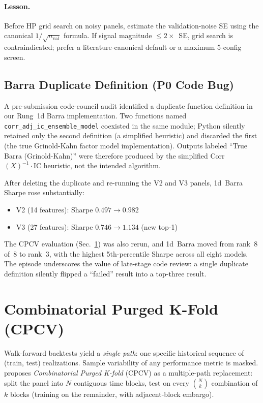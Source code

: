 \documentclass[11pt]{article}
\begin{document}
\paragraph{Lesson.}
Before HP grid search on noisy panels, estimate the validation-noise
SE using the canonical $1/\sqrt{n_{\text{val}}}$ formula. If signal
magnitude $\le 2\times$~SE, grid search is contraindicated; prefer a
literature-canonical default or a maximum 5-config screen.

\subsection{Barra Duplicate Definition (P0 Code Bug)}\label{subsec:barra-fix}

A pre-submission code-council audit identified a duplicate function
definition in our Rung~1d Barra implementation. Two functions named
\texttt{corr\_adj\_ic\_ensemble\_model} coexisted in the same module;
Python silently retained only the second definition (a simplified
heuristic) and discarded the first (the true Grinold-Kahn factor model
implementation). Outputs labeled ``True Barra (Grinold-Kahn)'' were
therefore produced by the simplified Corr$(X)^{-1}\cdot\text{IC}$
heuristic, not the intended algorithm.

After deleting the duplicate and re-running the V2 and V3 panels,
1d~Barra Sharpe rose substantially:
\begin{itemize}[leftmargin=2em,topsep=2pt,itemsep=2pt]
\item V2 (14 features): Sharpe $0.497 \to 0.982$
\item V3 (27 features): Sharpe $0.746 \to \mathbf{1.134}$ (new top-1)
\end{itemize}

The CPCV evaluation (Sec.~\ref{sec:cpcv}) was also rerun, and 1d~Barra
moved from rank~8 of~8 to rank~3, with the highest 5th-percentile
Sharpe across all eight models. The episode underscores the value of
late-stage code review: a single duplicate definition silently
flipped a ``failed'' result into a top-three result.

\section{Combinatorial Purged K-Fold (CPCV)}\label{sec:cpcv}

Walk-forward backtests yield a \emph{single path}: one specific
historical sequence of (train, test) realizations. Sample variability
of any performance metric is masked. \citet{lopezdeprado_finml}
proposes \emph{Combinatorial Purged K-fold} (CPCV) as a multiple-path
replacement: split the panel into $N$ contiguous time blocks, test on
every $\binom{N}{k}$ combination of $k$ blocks (training on the
remainder, with adjacent-block embargo).
\end{document}

